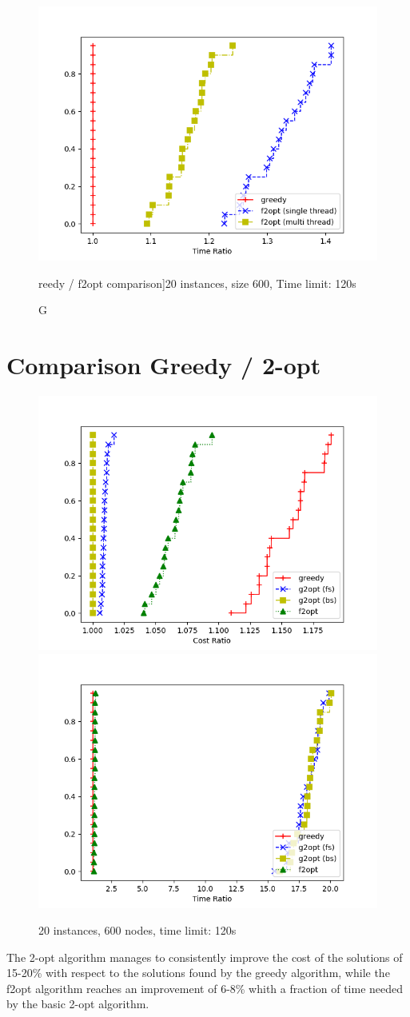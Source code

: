 \begin{figure}[h]
    \centering
    \includegraphics*[width=.5\textwidth]{../plots/perfprof_f2opt_times.png}
    \caption*Greedy / f2opt comparison]{20 instances, size 600, Time limit: 120s}
\end{figure}

\newpage 

\section{Comparison Greedy / 2-opt}

\begin{figure}[h]
    \centering
    \includegraphics*[width=.45\textwidth]{../plots/perfprof_heur_costs.png}
    \includegraphics*[width=.45\textwidth]{../plots/perfprof_heur_times.png}
    \caption*{20 instances, 600 nodes, time limit: 120s}
\end{figure}

The 2-opt algorithm manages to consistently improve the cost of the solutions of 15-20\% with respect to the solutions found by the greedy algorithm, while the f2opt algorithm reaches an improvement of 6-8\% whith a fraction of time needed by the basic 2-opt algorithm.

